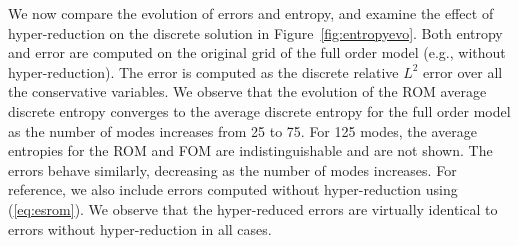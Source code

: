 \documentclass[preprint,10pt]{elsarticle}
\theoremstyle{definition}
\theoremstyle{lemma}
\theoremstyle{theorem}
\theoremstyle{assumption}
\begin{document}
We now compare the evolution of errors and entropy, and examine the effect of hyper-reduction on the discrete solution in Figure~\ref{fig:entropyevo}.  Both entropy and error are computed on the original grid of the full order model (e.g., without hyper-reduction).  The error is computed as the discrete relative $L^2$ error over all the conservative variables.  We observe that the evolution of the ROM average discrete entropy converges to the average discrete entropy for the full order model as the number of modes increases from 25 to 75.  For 125 modes, the average entropies for the ROM and FOM are indistinguishable and are not shown.  The errors behave similarly, decreasing as the number of modes increases.  For reference, we also include errors computed without hyper-reduction using (\ref{eq:esrom}).  We observe that the hyper-reduced errors are virtually identical to errors without hyper-reduction in all cases.
\end{document}
